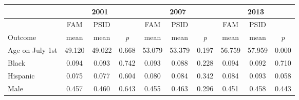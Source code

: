 \begin{tabular}{p{1.2in}*{3}{c}*{3}{c}*{3}{c}}
\hline
 \multicolumn{1}{c}{} & \multicolumn{3}{c}{2001} & \multicolumn{3}{c}{2007} & \multicolumn{3}{c}{2013} \\
\hline
 \multicolumn{1}{c}{} & FAM & PSID & & FAM & PSID & & FAM & PSID & \\
 \multicolumn{1}{l}{Outcome} & mean & mean & \textit{p} & mean & mean & \textit{p} & mean & mean & \textit{p} \\
\hline
Age on July 1st&49.120&49.022&0.668&53.079&53.379&0.197&56.759&57.959&0.000\\
Black&0.094&0.093&0.742&0.093&0.088&0.228&0.094&0.092&0.710\\
Hispanic&0.075&0.077&0.604&0.080&0.084&0.342&0.084&0.093&0.058\\
Male&0.457&0.460&0.643&0.455&0.463&0.296&0.451&0.458&0.443\\
\hline
\end{tabular}
